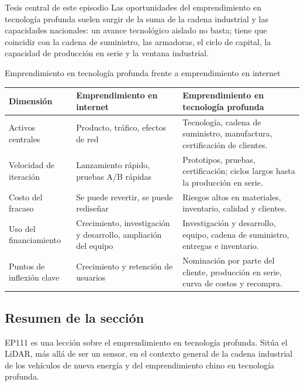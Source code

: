 \begin{importantbox}{Tesis central de este episodio}
Las oportunidades del emprendimiento en tecnología profunda suelen surgir de la suma de la cadena industrial y las capacidades nacionales: un avance tecnológico aislado no basta; tiene que coincidir con la cadena de suministro, las armadoras, el ciclo de capital, la capacidad de producción en serie y la ventana industrial.
\end{importantbox}

\begin{knowledgebox}{Emprendimiento en tecnología profunda frente a emprendimiento en internet}
\begin{tabularx}{\textwidth}{p{}p{}X}
\toprule
Dimensión & Emprendimiento en internet & Emprendimiento en tecnología profunda \\
\midrule
Activos centrales & Producto, tráfico, efectos de red & Tecnología, cadena de suministro, manufactura, certificación de clientes. \\
Velocidad de iteración & Lanzamiento rápido, pruebas A/B rápidas & Prototipos, pruebas, certificación; ciclos largos hasta la producción en serie. \\
Costo del fracaso & Se puede revertir, se puede rediseñar & Riesgos altos en materiales, inventario, calidad y clientes. \\
Uso del financiamiento & Crecimiento, investigación y desarrollo, ampliación del equipo & Investigación y desarrollo, equipo, cadena de suministro, entregas e inventario. \\
Puntos de inflexión clave & Crecimiento y retención de usuarios & Nominación por parte del cliente, producción en serie, curva de costos y recompra. \\
\bottomrule
\end{tabularx}
\end{knowledgebox}

\subsection{Resumen de la sección}

EP111 es una lección sobre el emprendimiento en tecnología profunda. Sitúa el LiDAR, más allá de ser un sensor, en el contexto general de la cadena industrial de los vehículos de nueva energía y del emprendimiento chino en tecnología profunda.
